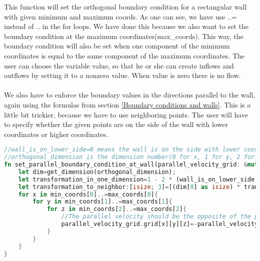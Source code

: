 \documentclass{article}
\begin{document}
This function will set the orthogonal boundary condition for a rectangular wall with given minimum and maximum coords. As one can see, we have use ..= instead of .. in the for loops. We have done this because we also want to set the boundary condition at the maximum coordinates(max\_coords). This way, the boundary condition will also be set when one component of the minimum coordinates is equal to the same  component of the maximum coordinates. The user can choose the variable value, so that he or she can create inflows and outflows by setting it to a nonzero value. When value is zero there is no flow.
\\ \\
We also have to enforce the boundary values in the directions parallel to the wall, again using the formulas from section \ref{Boundary conditions and walls}. This is a little bit trickier, because we have to use neighboring points. The user will have to specify whether the given points are on the side of the wall with lower coordinates or higher coordinates.
\begin{lstlisting}[language=Rust, style=boxed, breaklines=true]
//wall_is_on_lower_side=0 means the wall is on the side with lower coordinates seen from the dry side and wall_is_on_lower_side=1 means the wall is on the side with higher coordinates. 
//orthogonal_dimension is the dimension number(0 for x, 1 for y, 2 for z) of the dimension orthogonal to the wall
fn set_parallel_boundary_condition_at_wall(parallel_velocity_grid: &mut VelocityGrid, min_coords: [usize; 3], max_coords: [usize; 3], wall_is_on_lower_side: bool, orthogonal_dimension: usize){
    let dim=get_dimension(orthogonal_dimension);
    let transformation_in_one_dimension=1 - 2 * (wall_is_on_lower_side as isize);// -1 when a lower element is needed, +1 when a higher element is needed
    let transformation_to_neighbor:[isize; 3]=[(dim[0] as isize) * transformation_in_one_dimension, (dim[1] as isize) * transformation_in_one_dimension, (dim[2] as isize) * transformation_in_one_dimension];// This is the transformation to the neighbor opposite of the wall
    for x in min_coords[0]..=max_coords[0]{
        for y in min_coords[1]..=max_coords[1]{
            for z in min_coords[2]..=max_coords[2]{
                //The parallel velocity should be the opposite of the parallel velocity on the other side of the wall, so that the average is zero.
                parallel_velocity_grid.grid[x][y][z]=-parallel_velocity_grid.grid[(x as isize + transformation_to_neighbor[0])as usize][(y as isize + transformation_to_neighbor[1]) as usize][(z as isize+transformation_to_neighbor[2]) as usize];          
            }
        }
    }
}
\end{lstlisting}
\end{document}

